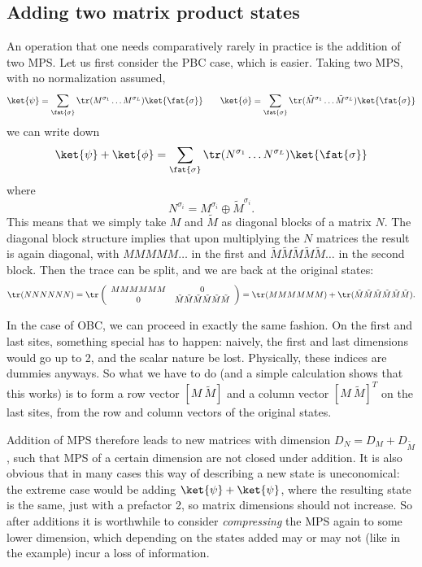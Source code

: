 \subsection{Adding two matrix product states}

An operation that one needs comparatively rarely in practice is the addition of two MPS. Let us first consider the PBC case, which is easier. Taking two MPS, with no normalization assumed,
\begin{equation}
\ket{\psi} = \sum_{\fat{\sigma}} \tr (M^{\sigma_1} \ldots M^{\sigma_L}) \ket{\fat{\sigma}} 
\quad\quad
\ket{\phi} = \sum_{\fat{\sigma}} \tr (\tilde{M}^{\sigma_1} \ldots \tilde{M}^{\sigma_L}) \ket{\fat{\sigma}} 
\end{equation}
we can write down
\begin{equation}
\ket{\psi} + \ket{\phi} = \sum_{\fat{\sigma}} \tr (N^{\sigma_1} \ldots N^{\sigma_L}) \ket{\fat{\sigma}}
\end{equation}
where 
\begin{equation}
N^{\sigma_i} =  M^{\sigma_i} \oplus \tilde{M}^{\sigma_i} .
\end{equation} 
This means that we simply take $M$ and $\tilde{M}$ as diagonal blocks of a matrix $N$. The diagonal block structure implies that upon multiplying the $N$ matrices the result is again diagonal, with $MMMMM\ldots$ in the first and $\tilde{M}\tilde{M}\tilde{M}\tilde{M}\tilde{M}\ldots$ in the second block. Then the trace can be split, and we are back at the original states:
\begin{equation}
\tr (NNNNNN) = \tr \left( \begin{array}{cc} MMMMMM & 0 \\ 0 & \tilde{M}\tilde{M}\tilde{M}\tilde{M}\tilde{M}\tilde{M} \end{array} \right) = \tr (MMMMMM) + \tr (\tilde{M}\tilde{M}\tilde{M}\tilde{M}\tilde{M}\tilde{M}).
\end{equation} 

In the case of OBC, we can proceed in exactly the same fashion. On the first and last sites, something special has to happen: naively, the first and last dimensions would go up to 2, and the scalar nature be lost. Physically, these indices are dummies anyways. So what we have to do (and a simple calculation shows that this works) is to form a row vector $[ M\ \tilde{M}]$ and a column vector $[M\ \tilde{M}]^T$ on the last sites, from the row and column vectors of the original states.

Addition of MPS therefore leads to new matrices with dimension $D_N = D_M + D_{\tilde{M}}$, such that MPS of a certain dimension are not closed under addition. It is also obvious that in many cases this way of describing a new state is uneconomical: the extreme case would be adding $\ket{\psi}+\ket{\psi}$, where the resulting state is the same, just with a prefactor 2, so matrix dimensions should not increase. So after additions it is worthwhile to consider {\em compressing} the MPS again to some lower dimension, which depending on the states added may or may not (like in the example) incur a loss of information.

